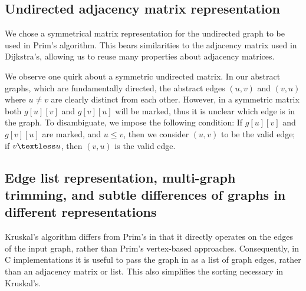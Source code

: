 \subsection{Undirected adjacency matrix representation}

We chose a symmetrical matrix representation for the undirected graph to be used in Prim's algorithm. This bears similarities to the adjacency matrix used in Dijkstra's, allowing us to reuse many properties about adjacency matrices.

We observe one quirk about a symmetric undirected matrix. In our abstract graphs, which are fundamentally directed, the abstract edges $(u,v)$ and $(v,u)$ where $u \neq v$ are clearly distinct from each other. However, in a symmetric matrix both $g[u][v]$ and $g[v][u]$ will be marked, thus it is unclear which edge is in the graph. To disambiguate, we impose the following condition: If $g[u][v]$ and $g[v][u]$ are marked, and $u \leq v$, then we consider $(u,v)$ to be the valid edge; if $v \textless u$, then $(v,u)$ is the valid edge.

\subsection{Edge list representation, multi-graph trimming, and subtle differences of graphs in different representations}
Kruskal's algorithm differs from Prim's in that it directly operates on the edges of the input graph, rather than Prim's vertex-based approaches. Consequently, in C implementations it is useful to pass the graph in as a list of graph edges, rather than an adjacency matrix or list. This also simplifies the sorting necessary in Kruskal's.

